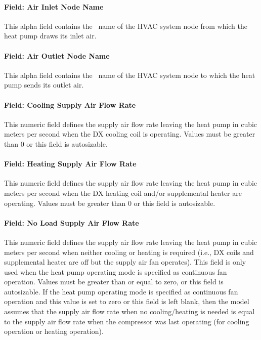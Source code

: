 \paragraph{Field: Air Inlet Node Name}\label{field-air-inlet-node-name-007}

This alpha field contains the~ name of the HVAC system node from which the heat pump draws its inlet air.

\paragraph{Field: Air Outlet Node Name}\label{field-air-outlet-node-name-006}

This alpha field contains the~ name of the HVAC system node to which the heat pump sends its outlet air.

\paragraph{Field: Cooling Supply Air Flow Rate}\label{field-cooling-supply-air-flow-rate-3-000}

This numeric field defines the supply air flow rate leaving the heat pump in cubic meters per second when the DX cooling coil is operating. Values must be greater than 0 or this field is autosizable.

\paragraph{Field: Heating Supply Air Flow Rate}\label{field-heating-supply-air-flow-rate-3-000}

This numeric field defines the supply air flow rate leaving the heat pump in cubic meters per second when the DX heating coil and/or supplemental heater are operating. Values must be greater than 0 or this field is autosizable.

\paragraph{Field: No Load Supply Air Flow Rate}\label{field-no-load-supply-air-flow-rate-3-000}

This numeric field defines the supply air flow rate leaving the heat pump in cubic meters per second when neither cooling or heating is required (i.e., DX coils and supplemental heater are off but the supply air fan operates). This field is only used when the heat pump operating mode is specified as continuous fan operation. Values must be greater than or equal to zero, or this field is autosizable. If the heat pump operating mode is specified as continuous fan operation and this value is set to zero or this field is left blank, then the model assumes that the supply air flow rate when no cooling/heating is needed is equal to the supply air flow rate when the compressor was last operating (for cooling operation or heating operation).


